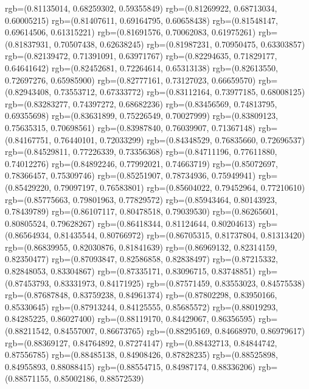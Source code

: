 {{        rgb=(0.81135014, 0.68259302, 0.59355849)
        rgb=(0.81269922, 0.68713034, 0.60005215)
        rgb=(0.81407611, 0.69164795, 0.60658438)
        rgb=(0.81548147, 0.69614506, 0.61315221)
        rgb=(0.81691576, 0.70062083, 0.61975261)
        rgb=(0.81837931, 0.70507438, 0.62638245)
        rgb=(0.81987231, 0.70950475, 0.63303857)
        rgb=(0.82139472, 0.71391091, 0.63971767)
        rgb=(0.82294635, 0.71829177, 0.64641642)
        rgb=(0.82452681, 0.72264614, 0.65313138)
        rgb=(0.82613550, 0.72697276, 0.65985900)
        rgb=(0.82777161, 0.73127023, 0.66659570)
        rgb=(0.82943408, 0.73553712, 0.67333772)
        rgb=(0.83112164, 0.73977185, 0.68008125)
        rgb=(0.83283277, 0.74397272, 0.68682236)
        rgb=(0.83456569, 0.74813795, 0.69355698)
        rgb=(0.83631899, 0.75226549, 0.70027999)
        rgb=(0.83809123, 0.75635315, 0.70698561)
        rgb=(0.83987840, 0.76039907, 0.71367148)
        rgb=(0.84167751, 0.76440101, 0.72033299)
        rgb=(0.84348529, 0.76835660, 0.72696537)
        rgb=(0.84529811, 0.77226339, 0.73356368)
        rgb=(0.84711196, 0.77611880, 0.74012276)
        rgb=(0.84892246, 0.77992021, 0.74663719)
        rgb=(0.85072697, 0.78366457, 0.75309746)
        rgb=(0.85251907, 0.78734936, 0.75949941)
        rgb=(0.85429220, 0.79097197, 0.76583801)
        rgb=(0.85604022, 0.79452964, 0.77210610)
        rgb=(0.85775663, 0.79801963, 0.77829572)
        rgb=(0.85943464, 0.80143923, 0.78439789)
        rgb=(0.86107117, 0.80478518, 0.79039530)
        rgb=(0.86265601, 0.80805524, 0.79628267)
        rgb=(0.86418344, 0.81124644, 0.80204613)
        rgb=(0.86564934, 0.81435544, 0.80766972)
        rgb=(0.86705315, 0.81737804, 0.81313420)
        rgb=(0.86839955, 0.82030876, 0.81841639)
        rgb=(0.86969132, 0.82314159, 0.82350477)
        rgb=(0.87093847, 0.82586858, 0.82838497)
        rgb=(0.87215332, 0.82848053, 0.83304867)
        rgb=(0.87335171, 0.83096715, 0.83748851)
        rgb=(0.87453793, 0.83331973, 0.84171925)
        rgb=(0.87571459, 0.83553023, 0.84575538)
        rgb=(0.87687848, 0.83759238, 0.84961374)
        rgb=(0.87802298, 0.83950166, 0.85330645)
        rgb=(0.87913244, 0.84125555, 0.85685572)
        rgb=(0.88019293, 0.84285225, 0.86027400)
        rgb=(0.88119170, 0.84429067, 0.86356595)
        rgb=(0.88211542, 0.84557007, 0.86673765)
        rgb=(0.88295169, 0.84668970, 0.86979617)
        rgb=(0.88369127, 0.84764892, 0.87274147)
        rgb=(0.88432713, 0.84844742, 0.87556785)
        rgb=(0.88485138, 0.84908426, 0.87828235)
        rgb=(0.88525898, 0.84955893, 0.88088415)
        rgb=(0.88554715, 0.84987174, 0.88336206)
        rgb=(0.88571155, 0.85002186, 0.88572539)
    }
}